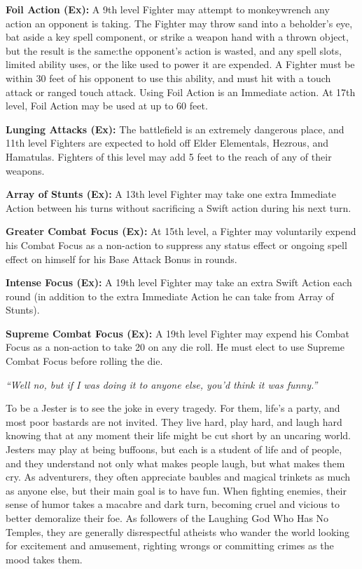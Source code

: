 \documentclass[10pt]{article}
\newcommand{\ability}[2]{\smallskip \noindent \textbf{#1} #2}
\newcommand{\classname}[1]{\noindent{\huge \textbf{#1}}}
\newcommand{\quot}[1]{\emph{#1}\medskip}
\newcommand{\desc}[1]{#1 \medskip}
\begin{document}
\ability{Foil Action (Ex):}{A 9th level Fighter may attempt to monkeywrench any action an opponent is taking. The Fighter may throw sand into a beholder's eye, bat aside a key spell component, or strike a weapon hand with a thrown object, but the result is the same:}{the opponent's action is wasted, and any spell slots, limited ability uses, or the like used to power it are expended. A Fighter must be within 30 feet of his opponent to use this ability, and must hit with a touch attack or ranged touch attack. Using Foil Action is an Immediate action. At 17th level, Foil Action may be used at up to 60 feet.}

\ability{Lunging Attacks (Ex):}{The battlefield is an extremely dangerous place, and 11th level Fighters are expected to hold off Elder Elementals, Hezrous, and Hamatulas. Fighters of this level may add 5 feet to the reach of any of their weapons.}

\ability{Array of Stunts (Ex):}{A 13th level Fighter may take one extra Immediate Action between his turns without sacrificing a Swift action during his next turn.}

\ability{Greater Combat Focus (Ex):}{At 15th level, a Fighter may voluntarily expend his Combat Focus as a non-action to suppress any status effect or ongoing spell effect on himself for his Base Attack Bonus in rounds.}

\ability{Intense Focus (Ex):}{A 19th level Fighter may take an extra Swift Action each round (in addition to the extra Immediate Action he can take from Array of Stunts).}

\ability{Supreme Combat Focus (Ex):}{A 19th level Fighter may expend his Combat Focus as a non-action to take 20 on any die roll. He must elect to use Supreme Combat Focus before rolling the die.}

\newpage


\classname{Jester}

\quot{``Well no, but if I was doing it to anyone else, you'd think it was funny.''}

\desc{To be a Jester is to see the joke in every tragedy. For them, life's a party, and most poor bastards are not invited. They live hard, play hard, and laugh hard knowing that at any moment their life might be cut short by an uncaring world. Jesters may play at being buffoons, but each is a student of life and of people, and they understand not only what makes people laugh, but what makes them cry. As adventurers, they often appreciate baubles and magical trinkets as much as anyone else, but their main goal is to have fun. When fighting enemies, their sense of humor takes a macabre and dark turn, becoming cruel and vicious to better demoralize their foe. As followers of the Laughing God Who Has No Temples, they are generally disrespectful atheists who wander the world looking for excitement and amusement, righting wrongs or committing crimes as the mood takes them.}
\end{document}
